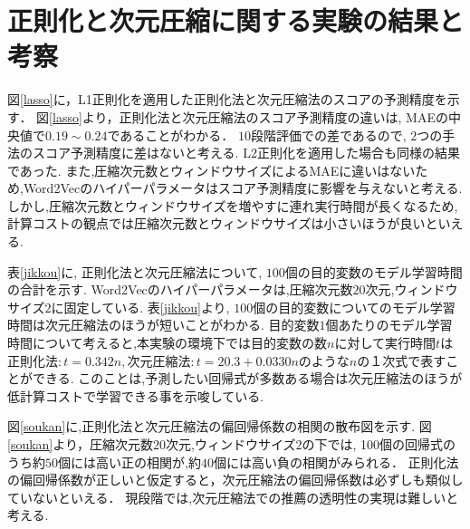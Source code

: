 \section{正則化と次元圧縮に関する実験の結果と考察}

図\ref{lasso}に，L1正則化を適用した正則化法と次元圧縮法のスコアの予測精度を示す．
図\ref{lasso}より，正則化法と次元圧縮法のスコア予測精度の違いは, MAEの中央値で$0.19 \sim 0.24$であることがわかる．
$10$段階評価での差であるので, $2$つの手法のスコア予測精度に差はないと考える.
L2正則化を適用した場合も同様の結果であった.
また,圧縮次元数とウィンドウサイズによるMAEに違いはないため,Word2Vecのハイパーパラメータはスコア予測精度に影響を与えないと考える.
しかし,圧縮次元数とウィンドウサイズを増やすに連れ実行時間が長くなるため,計算コストの観点では圧縮次元数とウィンドウサイズは小さいほうが良いといえる.



表\ref{jikkou}に, 正則化法と次元圧縮法について, $100$個の目的変数のモデル学習時間の合計を示す.
Word2Vecのハイパーパラメータは,圧縮次元数$20$次元,ウィンドウサイズ$2$に固定している.
表\ref{jikkou}より, $100$個の目的変数についてのモデル学習時間は次元圧縮法のほうが短いことがわかる.
目的変数$1$個あたりのモデル学習時間について考えると,本実験の環境下では目的変数の数$n$に対して実行時間$t$は$正則化法: t = 0.342 n, 次元圧縮法: t = 20.3 + 0.0330 n$のような$n$の１次式で表すことができる.
このことは,予測したい回帰式が多数ある場合は次元圧縮法のほうが低計算コストで学習できる事を示唆している.

図\ref{soukan}に,正則化法と次元圧縮法の偏回帰係数の相関の散布図を示す.
図\ref{soukan}より，圧縮次元数$20$次元,ウィンドウサイズ$2$の下では, 100個の回帰式のうち約$50$個には高い正の相関が,約$40$個には高い負の相関がみられる．
正則化法の偏回帰係数が正しいと仮定すると，次元圧縮法の偏回帰係数は必ずしも類似していないといえる．
現段階では,次元圧縮法での推薦の透明性の実現は難しいと考える.